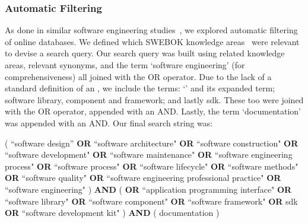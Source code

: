 
\subsubsection{Automatic Filtering}

As done in similar software engineering studies~\citep{Glass:2002wa,Usman:2017hn,GAROUSI2019101}, we explored  automatic filtering of online databases. We defined which SWEBOK  knowledge areas~\citep{IEEE:1990wp} were relevant to devise a search query. Our search query was built using related knowledge areas, relevant synonyms, and the term `software engineering' (for comprehensiveness) all joined with the OR operator. Due to the lack of a standard definition of an , we include the terms: `' and its expanded term; software library, component and framework; and lastly \gls{sdk}. These too were joined with the OR operator, appended with an AND. Lastly, the term `documentation' was appended with an AND.
Our final search string was:
\begin{framed}
\noindent
\parbox{\linewidth}{
\scriptsize
( ``software design'' \textbf{OR} ``software architecture" \textbf{OR} ``software construction" \textbf{OR} ``software development" \textbf{OR} ``software maintenance" \textbf{OR} ``software engineering process" \textbf{OR} ``software process" \textbf{OR} ``software lifecycle" \textbf{OR} ``software methods" \textbf{OR} ``software quality" \textbf{OR} ``software engineering professional practice" \textbf{OR} ``software engineering" ) \textbf{AND} (  \textbf{OR} ``application programming interface" \textbf{OR} ``software library" \textbf{OR} ``software component" \textbf{OR} ``software framework" \textbf{OR} sdk \textbf{OR} ``software development kit" ) \textbf{AND} ( documentation )
}
\end{framed}

